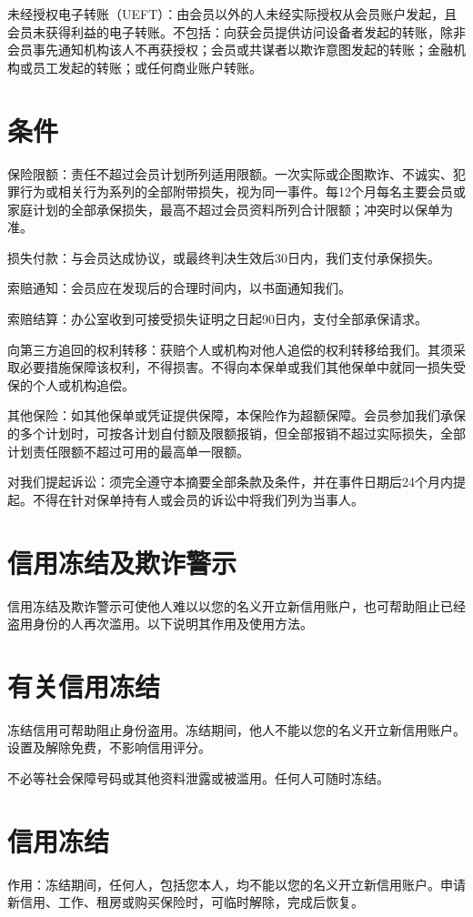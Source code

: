 \documentclass[UTF8,fontset=none,11pt,a4paper]{ctexart}
\begin{document}
未经授权电子转账（UEFT）：由会员以外的人未经实际授权从会员账户发起，且会员未获得利益的电子转账。不包括：向获会员提供访问设备者发起的转账，除非会员事先通知机构该人不再获授权；会员或共谋者以欺诈意图发起的转账；金融机构或员工发起的转账；或任何商业账户转账。


\section*{条件}
保险限额：责任不超过会员计划所列适用限额。一次实际或企图欺诈、不诚实、犯罪行为或相关行为系列的全部附带损失，视为同一事件。每12个月每名主要会员或家庭计划的全部承保损失，最高不超过会员资料所列合计限额；冲突时以保单为准。


损失付款：与会员达成协议，或最终判决生效后30日内，我们支付承保损失。


索赔通知：会员应在发现后的合理时间内，以书面通知我们。


索赔结算：办公室收到可接受损失证明之日起90日内，支付全部承保请求。


向第三方追回的权利转移：获赔个人或机构对他人追偿的权利转移给我们。其须采取必要措施保障该权利，不得损害。不得向本保单或我们其他保单中就同一损失受保的个人或机构追偿。


其他保险：如其他保单或凭证提供保障，本保险作为超额保障。会员参加我们承保的多个计划时，可按各计划自付额及限额报销，但全部报销不超过实际损失，全部计划责任限额不超过可用的最高单一限额。


对我们提起诉讼：须完全遵守本摘要全部条款及条件，并在事件日期后24个月内提起。不得在针对保单持有人或会员的诉讼中将我们列为当事人。


\section*{信用冻结及欺诈警示}
信用冻结及欺诈警示可使他人难以以您的名义开立新信用账户，也可帮助阻止已经盗用身份的人再次滥用。以下说明其作用及使用方法。


\section*{有关信用冻结}
冻结信用可帮助阻止身份盗用。冻结期间，他人不能以您的名义开立新信用账户。设置及解除免费，不影响信用评分。


不必等社会保障号码或其他资料泄露或被滥用。任何人可随时冻结。


\section*{信用冻结}
作用：冻结期间，任何人，包括您本人，均不能以您的名义开立新信用账户。申请新信用、工作、租房或购买保险时，可临时解除，完成后恢复。
\end{document}
